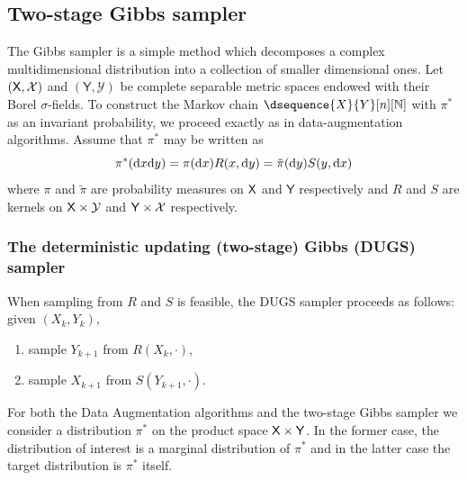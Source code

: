 \documentclass[english,graybox,envcountchap,envcountsame,sectrefs,shortlabels]{svmono}
\theoremstyle{style}
\newcommand{\Yset}{\mathsf{Y}}
\newcommand{\Ysigma}{\mathcal{Y}}
\begin{document}
\subsection{Two-stage Gibbs sampler}
\label{sec:two-stages-gibbs}
The Gibbs sampler is a simple method which decomposes a complex multidimensional distribution into a
collection of smaller dimensional ones.  Let $(\mathsf{X},\mathcal{X})$ and $(\Yset,\Ysigma)$ be complete
separable metric spaces endowed with their Borel $\sigma$-fields.  To construct the Markov chain
$\dsequence{X}{Y}[n][\nset]$ with $\pi^*$ as an invariant probability, we proceed exactly as in
data-augmentation algorithms. Assume that $\pi^*$ may be written as
\begin{equation}
  \label{eq:definition-pistar}
  \pi^*(\mathrm{d} x\mathrm{d} y) = \pi(\mathrm{d} x) R(x,\mathrm{d} y) = \tilde{\pi}(\mathrm{d} y)   S(y,\mathrm{d} x)
\end{equation}
where $\pi$ and $\tilde \pi$ are probability measures on $\mathsf{X}$ and $\Yset$ respectively and $R$
and $S$ are kernels on $\Xset \times \Ysigma$ and $\Yset \times \Xsigma$ respectively.


\subsubsection*{The deterministic updating (two-stage) Gibbs (DUGS) sampler}
When sampling from $R$ and $S$ is feasible, the DUGS sampler proceeds as follows: given $(X_k,Y_k)$,
\begin{enumerate}[({DUGS}1)]
\item \label{item:gibbs-1} sample $Y_{k+1}$ from $R(X_k,\cdot)$,
\item \label{item:gibbs-2} sample $X_{k+1}$ from $S(Y_{k+1},\cdot)$.
\end{enumerate}
For both the Data Augmentation algorithms and the two-stage Gibbs sampler we consider a distribution
$\pi^*$ on the product space $\Xset \times \Yset$. In the former case, the distribution of interest
is a marginal distribution of $\pi^*$ and in the latter case the target
distribution is $\pi^*$ itself.
\end{document}
